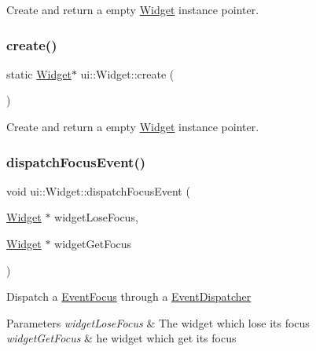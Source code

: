 Create and return a empty \hyperlink{classui_1_1Widget}{Widget} instance pointer. \mbox{\label{classui_1_1Widget_ab3a68a94480a985adbd851b7d1007839}} 
\subsubsection{\texorpdfstring{create()}{create()}\hspace{0.1cm}{\footnotesize\ttfamily [2/2]}}
{\footnotesize\ttfamily static \hyperlink{classui_1_1Widget}{Widget}$\ast$ ui\+::\+Widget\+::create (\begin{DoxyParamCaption}{ }\end{DoxyParamCaption})\hspace{0.3cm}{\ttfamily [static]}}

Create and return a empty \hyperlink{classui_1_1Widget}{Widget} instance pointer. \mbox{\label{classui_1_1Widget_ae54dd6bc70002d784f9b04fd7ccc057c}} 
\subsubsection{\texorpdfstring{dispatch\+Focus\+Event()}{dispatchFocusEvent()}\hspace{0.1cm}{\footnotesize\ttfamily [1/2]}}
{\footnotesize\ttfamily void ui\+::\+Widget\+::dispatch\+Focus\+Event (\begin{DoxyParamCaption}\item[{\hyperlink{classui_1_1Widget}{Widget} $\ast$}]{widget\+Lose\+Focus,  }\item[{\hyperlink{classui_1_1Widget}{Widget} $\ast$}]{widget\+Get\+Focus }\end{DoxyParamCaption})}

Dispatch a \hyperlink{classEventFocus}{Event\+Focus} through a \hyperlink{classEventDispatcher}{Event\+Dispatcher} 
\begin{DoxyParams}{Parameters}
{\em widget\+Lose\+Focus} & The widget which lose its focus \\
\hline
{\em widget\+Get\+Focus} & he widget which get its focus \\
\hline
\end{DoxyParams}
\mbox{\label{classui_1_1Widget_ae54dd6bc70002d784f9b04fd7ccc057c}} 
